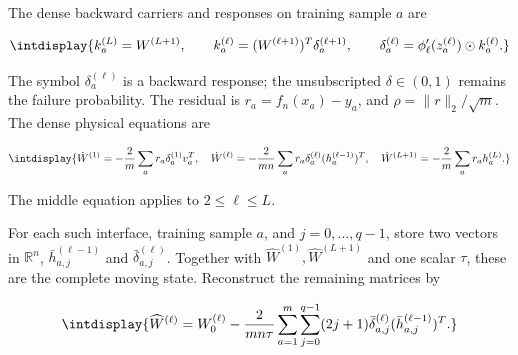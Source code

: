 
The dense backward carriers and responses on training sample \(a\) are


\begingroup\renewcommand{\theHequation}{intdisplay.99}
\begin{equation*}
\intdisplay{
k_a^{(L)}=W^{(L+1)},\qquad
k_a^{(\ell)}=(W^{(\ell+1)})^T\delta_a^{(\ell+1)},\qquad
\delta_a^{(\ell)}=\phi_\ell'(z_a^{(\ell)})\odot k_a^{(\ell)}.
}
\end{equation*}
\endgroup


The symbol \(\delta_a^{(\ell)}\) is a backward response; the unsubscripted \(\delta\in(0,\allowbreak 1)\) remains the failure probability. The residual is \(r_a=f_n(x_a)-y_a\), and \(\rho=\|r\|_2/\sqrt m\). The dense physical equations are


\begingroup\renewcommand{\theHequation}{intdisplay.100}
\begin{equation}
\intdisplay{
\dot W^{(1)}=-\frac2m\sum_a r_a\delta_a^{(1)}v_a^T,
\quad
\dot W^{(\ell)}=-\frac2{mn}\sum_a
r_a\delta_a^{(\ell)}(h_a^{(\ell-1)})^T,
\quad
\dot W^{(L+1)}=-\frac2m\sum_a r_ah_a^{(L)}.
}
\label{int:eq-0029-legendre-dense-flow}
\end{equation}
\endgroup


The middle equation applies to \(2\le\ell\le L\).



For each such interface, training sample \(a\), and \(j=0,\allowbreak \ldots,\allowbreak q-1\), store two vectors in \(\mathbb R^n\), \(\bar h_{a,\allowbreak j}^{(\ell-1)}\) and \(\bar\delta_{a,\allowbreak j}^{(\ell)}\). Together with \(\widehat W^{(1)},\allowbreak \widehat W^{(L+1)}\) and one scalar \(\tau\), these are the complete moving state. Reconstruct the remaining matrices by


\begingroup\renewcommand{\theHequation}{intdisplay.101}
\begin{equation}
\intdisplay{
\widehat W^{(\ell)}
=W_0^{(\ell)}-
\frac2{mn\tau}\sum_{a=1}^m\sum_{j=0}^{q-1}(2j+1)
\bar\delta_{a,j}^{(\ell)}
(\bar h_{a,j}^{(\ell-1)})^T.
}
\label{int:eq-0030-legendre-reconstruction}
\end{equation}
\endgroup


